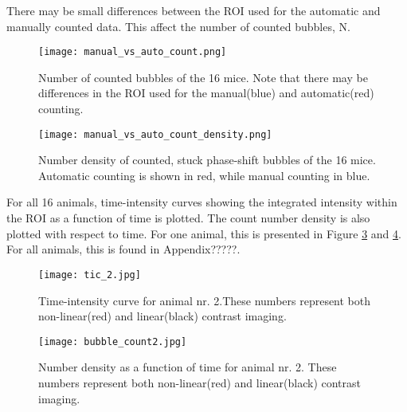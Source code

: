 There may be small differences between the ROI used for the automatic and manually counted data. This affect the number of counted bubbles, N.

\begin{figure}[h]
  \centering
  \label{Fig:Number of counted bubbles}
  \texttt{[image: manual\_vs\_auto\_count.png]}
  \caption{Number of counted bubbles of the 16 mice. Note that there may be differences in the ROI used for the manual(blue) and automatic(red) counting.}
\end{figure}

\begin{figure}[h]
  \centering
  \label{Fig:Number density of counted bubbles}
  \texttt{[image: manual\_vs\_auto\_count\_density.png]}
  \caption{Number density of counted, stuck phase-shift bubbles of the 16 mice. Automatic counting is shown in red, while manual counting in blue.}
\end{figure}

For all 16 animals, time-intensity curves showing the integrated intensity within the ROI as a function of time is plotted. The count number density is also plotted with respect to time. For  one animal, this is presented in Figure \ref{Fig:tic} and \ref{Fig:tic_count}. For all animals, this is found in Appendix?????.


\begin{figure}[h]
  \centering
  \label{Fig:tic}
  \texttt{[image: tic\_2.jpg]}
  \caption{Time-intensity curve for animal nr. 2.These numbers represent both non-linear(red) and linear(black) contrast imaging.}
\end{figure}

\begin{figure}[h]
  \centering
  \label{Fig:tic_count}
  \texttt{[image: bubble\_count2.jpg]}
  \caption{Number density as a function of time for animal nr. 2. These numbers represent both non-linear(red) and linear(black) contrast imaging.}
\end{figure}




